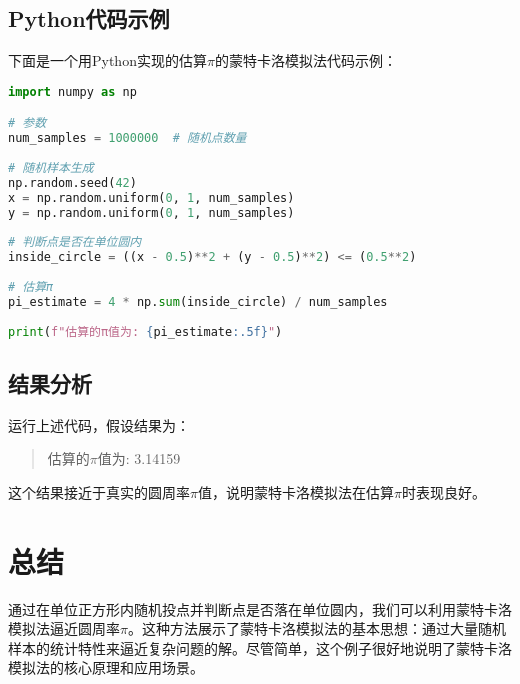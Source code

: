 \documentclass{article}
\begin{document}
\subsection{Python代码示例}
下面是一个用Python实现的估算$\pi$的蒙特卡洛模拟法代码示例：

\begin{lstlisting}[language=Python]
import numpy as np

# 参数
num_samples = 1000000  # 随机点数量
    
# 随机样本生成
np.random.seed(42)
x = np.random.uniform(0, 1, num_samples)
y = np.random.uniform(0, 1, num_samples)
    
# 判断点是否在单位圆内
inside_circle = ((x - 0.5)**2 + (y - 0.5)**2) <= (0.5**2)
    
# 估算π
pi_estimate = 4 * np.sum(inside_circle) / num_samples
    
print(f"估算的π值为: {pi_estimate:.5f}")
\end{lstlisting}
    
    
    

\subsection{结果分析}
运行上述代码，假设结果为：
\begin{quote}
估算的$\pi$值为: 3.14159
\end{quote}
这个结果接近于真实的圆周率$\pi$值，说明蒙特卡洛模拟法在估算$\pi$时表现良好。

\section{总结}
通过在单位正方形内随机投点并判断点是否落在单位圆内，我们可以利用蒙特卡洛模拟法逼近圆周率$\pi$。这种方法展示了蒙特卡洛模拟法的基本思想：通过大量随机样本的统计特性来逼近复杂问题的解。尽管简单，这个例子很好地说明了蒙特卡洛模拟法的核心原理和应用场景。
\end{document}
